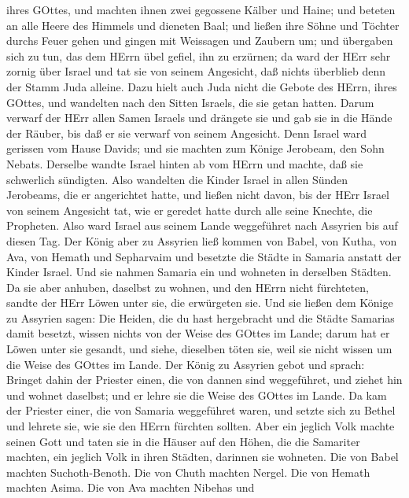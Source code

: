 ihres GOttes, und machten ihnen zwei gegossene Kälber und Haine; und
beteten an alle Heere des Himmels und dieneten Baal;  und
ließen ihre Söhne und Töchter durchs Feuer gehen und gingen mit
Weissagen und Zaubern um; und übergaben sich zu tun, das dem HErrn übel
gefiel, ihn zu erzürnen;  da ward der HErr sehr zornig über
Israel und tat sie von seinem Angesicht, daß nichts überblieb denn der
Stamm Juda alleine.  Dazu hielt auch Juda nicht die Gebote
des HErrn, ihres GOttes, und wandelten nach den Sitten Israels, die sie
getan hatten.  Darum verwarf der HErr allen Samen Israels
und drängete sie und gab sie in die Hände der Räuber, bis daß er sie
verwarf von seinem Angesicht.  Denn Israel ward gerissen
vom Hause Davids; und sie machten zum Könige Jerobeam, den Sohn Nebats.
Derselbe wandte Israel hinten ab vom HErrn und machte, daß sie
schwerlich sündigten.  Also wandelten die Kinder Israel in
allen Sünden Jerobeams, die er angerichtet hatte, und ließen nicht
davon,  bis der HErr Israel von seinem Angesicht tat, wie
er geredet hatte durch alle seine Knechte, die Propheten. Also ward
Israel aus seinem Lande weggeführet nach Assyrien bis auf diesen Tag.
 Der König aber zu Assyrien ließ kommen von Babel, von
Kutha, von Ava, von Hemath und Sepharvaim und besetzte die Städte in
Samaria anstatt der Kinder Israel. Und sie nahmen Samaria ein und
wohneten in derselben Städten.  Da sie aber anhuben,
daselbst zu wohnen, und den HErrn nicht fürchteten, sandte der HErr
Löwen unter sie, die erwürgeten sie.  Und sie ließen dem
Könige zu Assyrien sagen: Die Heiden, die du hast hergebracht und die
Städte Samarias damit besetzt, wissen nichts von der Weise des GOttes im
Lande; darum hat er Löwen unter sie gesandt, und siehe, dieselben töten
sie, weil sie nicht wissen um die Weise des GOttes im Lande.
 Der König zu Assyrien gebot und sprach: Bringet dahin der
Priester einen, die von dannen sind weggeführet, und ziehet hin und
wohnet daselbst; und er lehre sie die Weise des GOttes im Lande.
 Da kam der Priester einer, die von Samaria weggeführet
waren, und setzte sich zu Bethel und lehrete sie, wie sie den HErrn
fürchten sollten.  Aber ein jeglich Volk machte seinen Gott
und taten sie in die Häuser auf den Höhen, die die Samariter machten,
ein jeglich Volk in ihren Städten, darinnen sie wohneten. 
Die von Babel machten Suchoth-Benoth. Die von Chuth machten Nergel. Die
von Hemath machten Asima.  Die von Ava machten Nibehas und
